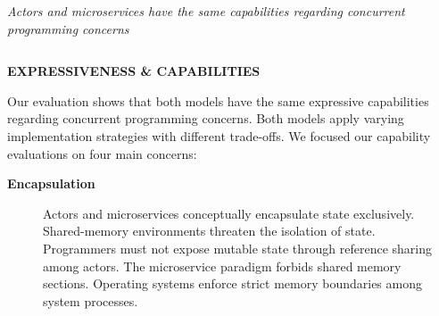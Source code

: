 \documentclass[final,hyperref={pdfpagelabels=true}]{beamer}
\newcommand{\sectionlinetwo}[2]{%
  \nointerlineskip 
  \vspace{.5\baselineskip}
  \hspace{\fill}
  {\color{#1}
    \resizebox{.2\linewidth}{2.5ex}
    {{%
    {\begin{tikzpicture}
    \node (C) at (0,0) {};
    \node (D) at (9,0) {};
    \path (C) to [ornament=#2] (D);
    \end{tikzpicture}}}}}%
    \hspace{\fill}
    \par\nointerlineskip \vspace{.5\baselineskip}
  }
\begin{document}
\begin{frame}
  \vspace*{2.2\baselineskip}

  \begin{columns}[t]
    \begin{column}{.04\textwidth}
    \end{column}
    \begin{column}{.92\textwidth}
      \begin{center}
        {\lmodern \Large \frqq\textsl{Actors and microservices have the same
          capabilities regarding concurrent programming concerns}\flqq}
      \end{center}
    \end{column}
    \begin{column}{.04\textwidth}
    \end{column}
  \end{columns}

  \vspace*{2.7\baselineskip}

  
  \begin{columns}[t]
    \begin{column}{.04\textwidth}
      \end{column}
    \begin{column}{.43\textwidth}
      \textsf{\textbf{EXPRESSIVENESS \& CAPABILITIES}} \\
      \vspace*{.5\baselineskip}
      {\lmodern
        \begin{justify}
        Our evaluation shows that both models have the same expressive
        capabilities regarding concurrent programming concerns. Both models
        apply varying implementation strategies with different trade-offs. We
        focused our capability evaluations on four main concerns:
        \end{justify}
        
        \vspace*{0.5\baselineskip}

        \renewcommand\sfdefault{lmss} %

        \begin{description}
          \item[\textbf{\textsf{Encapsulation}}] 
          \begin{justify}
          Actors and microservices conceptually encapsulate state exclusively.
          Shared-memory environments threaten the isolation of state.
          Programmers must not expose mutable state through reference sharing
          among actors. The microservice paradigm forbids shared memory
          sections. Operating systems enforce strict memory boundaries among
          system processes.
          \end{justify}


\end{description}}
\end{column}
\end{columns}
\end{frame}
\end{document}
